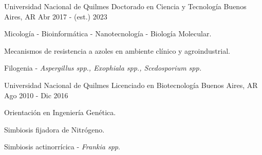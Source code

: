 

\begin{cventries}

  
  \cventry
    {Universidad Nacional de Quilmes} %
    {Doctorado en Ciencia y Tecnología} %
    {Buenos Aires, AR} %
    {Abr 2017 - (est.) 2023} %
    {
      \begin{cvitems} %
        \item {Micología - Bioinformática - Nanotecnología - Biología Molecular.}
        \item {Mecanismos de resistencia a azoles en ambiente clínico y agroindustrial.} 
        \item {Filogenia - \textit{Aspergillus spp., Exophiala spp., Scedosporium spp.}}
      \end{cvitems}
    }
    
  \cventry
    {Universidad Nacional de Quilmes} %
    {Licenciado en Biotecnología} %
    {Buenos Aires, AR} %
    {Ago 2010 - Dic 2016} %
    {
      \begin{cvitems} %
        \item {Orientación en Ingeniería Genética.}
        \item {Simbiosis fijadora de Nitrógeno.}
        \item {Simbiosis actinorrícica - \textit{Frankia spp}.}
      \end{cvitems}
    }
\end{cventries}
